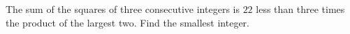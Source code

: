 The sum of the squares of three consecutive integers is $22$ less than three times the product of the largest two. Find the smallest integer.
